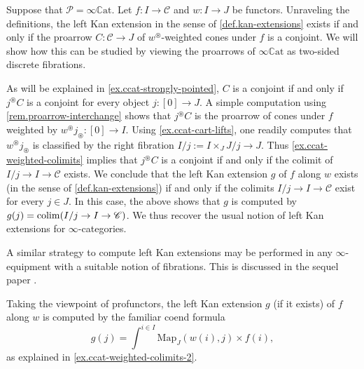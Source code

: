 \documentclass[a4paper, 11pt]{amsart}
\numberwithin{theorem}{section}
\theoremstyle{definition}
\newcommand{\map}{\mathrm{Map}}
\def\colim{\qopname\relax m{colim}}
\newcommand{\C}{\mathscr{C}}
\renewcommand{\P}{\mathscr{P}}
\newcommand{\CCAT}{\mathbb{C}\mathrm{at}}
\begin{document}
\begin{example}
	Suppose that $\P = \infty\CCAT$. Let $f : I \to \C$ and $w : I \to J$ be functors. Unraveling the definitions, 
	the left Kan extension in the sense of \cref{def.kan-extensions} exists if and only if the proarrow $C : \C \to J$ of  
	$w^\circledast$-weighted cones under $f$ is a conjoint. We will show how this can be studied by viewing the proarrows of $\infty\CCAT$ as two-sided discrete fibrations. 
	
	As will be explained in \cref{ex.ccat-strongly-pointed}, 
	$C$ is a conjoint if and only if $j^\circledast C$ is a conjoint for every object $j : [0] \to J$. 
	A simple computation using \cref{rem.proarrow-interchange} shows that $j^\circledast C$ is the proarrow of cones under $f$ weighted 
	by $w^\circledast j_\circledast : [0] \to I$. Using \cref{ex.ccat-cart-lifts}, one readily computes 
	that $w^\circledast j_\circledast$ is classified by the right fibration $I/j := I \times_J J/j \to J$. 
	Thus \cref{ex.ccat-weighted-colimits} implies that $j^\circledast C$ is a conjoint if and only if 
	the colimit of $I/j \to I \to \C$ exists. We conclude that the left Kan extension $g$ of $f$ along $w$ exists (in the sense of \cref{def.kan-extensions})
if and only if the colimits $I/j \to I \to \C$ exist for every $j \in J$. In this case, the above shows that $g$ is computed by $g(j) = \colim(I/j \to I \to \C)$.
	We thus recover the usual notion of left Kan extensions for $\infty$-categories.

A similar strategy to compute left Kan extensions may be performed in any $\infty$-equip\-ment with a suitable notion of fibrations. This is 
discussed in the sequel paper \cite[Section 7]{EquipII}.

	Taking the viewpoint of profunctors, the left Kan extension $g$ (if it exists) of $f$ along $w$ is computed by the familiar coend formula 
	$$
	g(j) = \int^{i \in I} \map_J(w(i), j) \times f(i),
	$$
	as explained in \cref{ex.ccat-weighted-colimits-2}.
\end{example}
\end{document}
